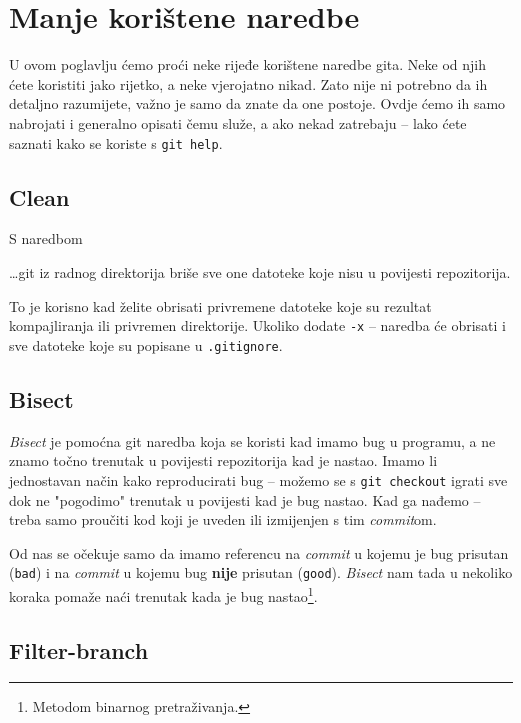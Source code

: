 \chapter*{Manje korištene naredbe}

U ovom poglavlju ćemo proći neke rijeđe korištene naredbe gita.
Neke od njih ćete koristiti jako rijetko, a neke vjerojatno nikad.
Zato nije ni potrebno da ih detaljno razumijete, važno je samo da znate da one postoje. 
Ovdje ćemo ih samo nabrojati i generalno opisati čemu služe, a ako nekad zatrebaju -- lako ćete saznati kako se koriste s \verb+git help+.

\section*{Clean}

S naredbom\do\TODO


\dots{}git iz radnog direktorija briše sve one datoteke koje nisu u povijesti repozitorija.

To je korisno kad želite obrisati privremene datoteke koje su rezultat kompajliranja ili privremen direktorije.
Ukoliko dodate \verb+-x+ -- naredba će obrisati i sve datoteke koje su popisane u \verb+.gitignore+.

\section*{Bisect}

\emph{Bisect} je pomoćna git naredba koja se koristi kad imamo bug u programu, a ne znamo točno trenutak u povijesti repozitorija kad je nastao.
Imamo li jednostavan način kako reproducirati bug -- možemo se s \verb+git checkout+ igrati sve dok ne "pogodimo" trenutak u povijesti kad je bug nastao. 
Kad ga nađemo -- treba samo proučiti kod koji je uveden ili izmijenjen s tim \emph{commit}om.

Od nas se očekuje samo da imamo referencu na \emph{commit} u kojemu je bug prisutan (\verb+bad+) i na \emph{commit} u kojemu bug \textbf{nije} prisutan (\verb+good+).
\emph{Bisect} nam tada u nekoliko koraka pomaže naći trenutak kada je bug nastao\footnote{Metodom binarnog pretraživanja.}.

\section*{Filter-branch}

